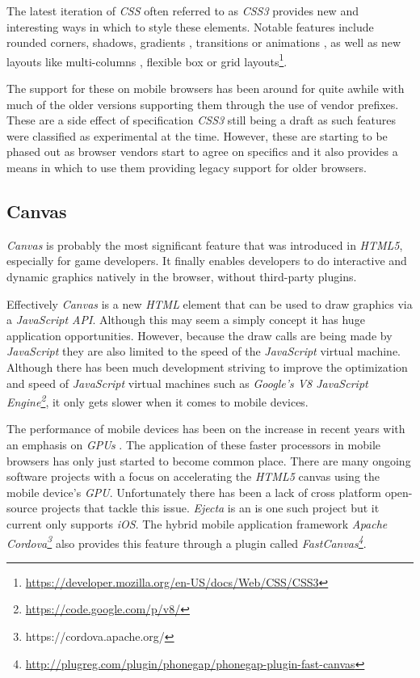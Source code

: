 \documentclass[final]{cmpreport}
\begin{document}
The latest iteration of \textit{CSS} often referred to as \textit{CSS3} provides new and interesting ways in which to style these elements. Notable features include rounded corners, shadows, gradients , transitions or animations , as well as new layouts like multi-columns , flexible box or grid layouts\footnote{\url{https://developer.mozilla.org/en-US/docs/Web/CSS/CSS3}}.

The support for these on mobile browsers has been around for quite awhile with much of the older versions supporting them through the use of vendor prefixes. These are a side effect of specification \textit{CSS3} still being a draft as such features were classified as experimental at the time. However, these are starting to be phased out as browser vendors start to agree on specifics and it also provides a means in which to use them providing legacy support for older browsers.

\subsection{Canvas}
\textit{Canvas} is probably the most significant feature that was introduced in \textit{HTML5}, especially for game developers. It finally enables developers to do interactive and dynamic graphics natively in the browser, without third-party plugins.

Effectively \textit{Canvas} is a new \textit{HTML} element that can be used to draw graphics via a \textit{JavaScript API}. Although this may seem a simply concept it has huge application opportunities. However, because the draw calls are being made by \textit{JavaScript} they are also limited to the speed of the \textit{JavaScript} virtual machine. Although there has been much development striving to improve the optimization and speed of \textit{JavaScript} virtual machines such as \textit{Google's V8 JavaScript Engine\footnote{\url{https://code.google.com/p/v8/}}}, it only gets slower when it comes to mobile devices.


The performance of mobile devices has been on the increase in recent years with an emphasis on \textit{GPUs} \cite{Lin}. The application of these faster processors in mobile browsers has only just started to become common place. There are many ongoing software projects with a focus on accelerating the \textit{HTML5} canvas using the mobile device's \textit{GPU}. Unfortunately there has been a lack of cross platform open-source projects that tackle this issue. \textit{Ejecta} is an is one such project but it current only supports \textit{iOS}. The hybrid mobile application framework \textit{Apache Cordova\footnote{https://cordova.apache.org/}} also provides this feature through a plugin called \textit{FastCanvas\footnote{\url{http://plugreg.com/plugin/phonegap/phonegap-plugin-fast-canvas}}}.
\end{document}
